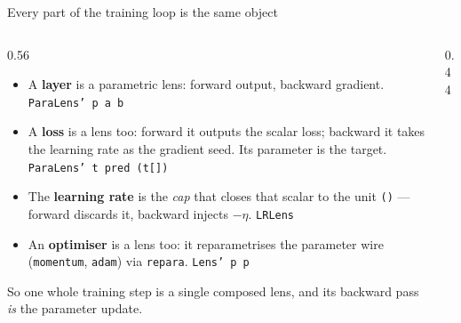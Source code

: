 \documentclass[aspectratio=169,11pt]{beamer}
\begin{document}
\begin{frame}[fragile]{Every part of the training loop is the same object}
  \begin{columns}[T]
    \begin{column}{0.56\textwidth}
      \footnotesize
      \begin{itemize}\setlength\itemsep{0.35em}
        \item A \textbf{layer} is a parametric lens: forward output, backward gradient.
              \hfill{\scriptsize\color{gray}\texttt{ParaLens' p a b}}
        \item A \textbf{loss} is a lens too: forward it outputs the scalar loss; backward it takes the
              learning rate as the gradient seed. Its parameter is the target.
              \hfill{\scriptsize\color{gray}\texttt{ParaLens' t pred (t[])}}
        \item The \textbf{learning rate} is the \emph{cap} that closes that scalar to the unit
              \texttt{()} --- forward discards it, backward injects $-\eta$.
              \hfill{\scriptsize\color{gray}\texttt{LRLens}}
        \item An \textbf{optimiser} is a lens too: it reparametrises the parameter wire
              (\texttt{momentum}, \texttt{adam}) via \texttt{repara}.
              \hfill{\scriptsize\color{gray}\texttt{Lens' p p}}
      \end{itemize}
      \vspace{0.5em}
      So one whole training step is a single composed lens, and its backward pass \emph{is} the
      parameter update.
    \end{column}
    \begin{column}{0.44\textwidth}
      \centering
\end{column}
\end{columns}
\end{frame}
\end{document}
